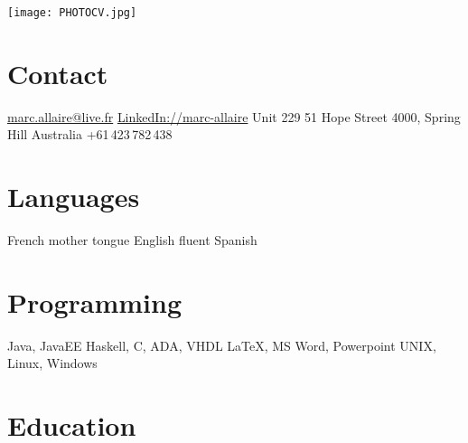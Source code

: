 \documentclass[]{friggeri-cv} %
\begin{document}


\begin{aside} %
\texttt{[image: PHOTOCV.jpg]}
\section{Contact}
\href{mailto:marc.allaire@live.fr}{marc.allaire@live.fr}
\href{http://www.linkedin.com/pub/marc-allaire/62/79/936}{LinkedIn://marc-allaire}
Unit 229
51 Hope Street
4000, Spring Hill
Australia
+61\,423\,782\,438
\section{Languages}
French mother tongue
English fluent
Spanish
\section{Programming}
Java, JavaEE
Haskell, 
C, ADA, VHDL
\LaTeX, MS Word, Powerpoint
UNIX, Linux, Windows
\end{aside}


\section{Education}
\end{document}
